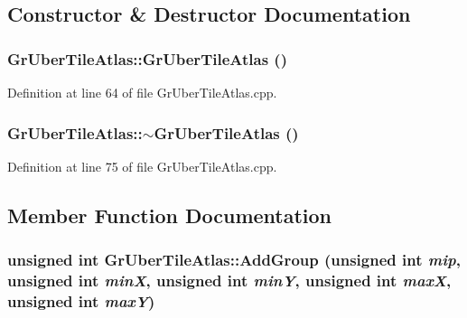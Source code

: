 \subsection{Constructor \& Destructor Documentation}
\hypertarget{class_gr_uber_tile_atlas_d03b6d95afc54589b9597609332bdfc2}{
\subsubsection[{GrUberTileAtlas}]{\setlength{\rightskip}{0pt plus 5cm}GrUberTileAtlas::GrUberTileAtlas ()}}
\label{class_gr_uber_tile_atlas_d03b6d95afc54589b9597609332bdfc2}




Definition at line 64 of file GrUberTileAtlas.cpp.\hypertarget{class_gr_uber_tile_atlas_d24d286ddf5e7dba79b7151ab9e5dbd3}{
\subsubsection[{$\sim$GrUberTileAtlas}]{\setlength{\rightskip}{0pt plus 5cm}GrUberTileAtlas::$\sim$GrUberTileAtlas ()}}
\label{class_gr_uber_tile_atlas_d24d286ddf5e7dba79b7151ab9e5dbd3}




Definition at line 75 of file GrUberTileAtlas.cpp.

\subsection{Member Function Documentation}
\hypertarget{class_gr_uber_tile_atlas_2defe5d25753145f86eb53f26424f91c}{
\subsubsection[{AddGroup}]{\setlength{\rightskip}{0pt plus 5cm}unsigned int GrUberTileAtlas::AddGroup (unsigned int {\em mip}, \/  unsigned int {\em minX}, \/  unsigned int {\em minY}, \/  unsigned int {\em maxX}, \/  unsigned int {\em maxY})}}
\label{class_gr_uber_tile_atlas_2defe5d25753145f86eb53f26424f91c}




